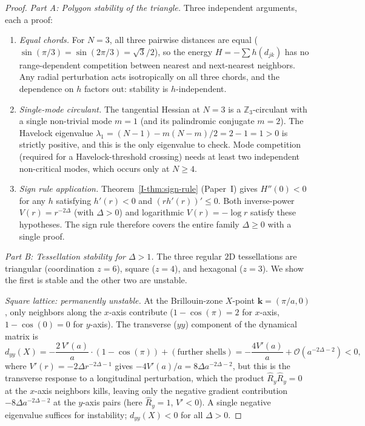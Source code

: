 \begin{proof}
\emph{Part A: Polygon stability of the triangle.}
Three independent arguments, each a proof:
\begin{enumerate}
\item \emph{Equal chords.}
  For $N = 3$, all three pairwise distances are equal
  ($\sin(\pi/3) = \sin(2\pi/3) = \sqrt{3}/2$),
  so the energy $H = -\sum h(d_{jk})$ has no
  range-dependent competition between nearest and next-nearest
  neighbors.
  Any radial perturbation acts isotropically on all three chords,
  and the dependence on $h$ factors out: stability is
  $h$-independent.

\item \emph{Single-mode circulant.}
  The tangential Hessian at $N = 3$ is a $\mathbb{Z}_3$-circulant
  with a single non-trivial mode $m = 1$ (and its palindromic
  conjugate $m = 2$).
  The Havelock eigenvalue
  $\lambda_1 = (N{-}1) - m(N{-}m)/2 = 2 - 1 = 1 > 0$
  is strictly positive, and this is the only eigenvalue
  to check.
  Mode competition (required for a Havelock-threshold crossing)
  needs at least two independent non-critical modes, which occurs
  only at $N \ge 4$.

\item \emph{Sign rule application.}
  Theorem~\ref*{I-thm:sign-rule} (Paper~I) gives $H''(0) < 0$
  for any $h$ satisfying $h'(r) < 0$ and $(rh'(r))' \le 0$.
  Both inverse-power $V(r) = r^{-2\Delta}$ (with $\Delta > 0$) and
  logarithmic $V(r) = -\log r$ satisfy these hypotheses.
  The sign rule therefore covers the entire family $\Delta \ge 0$
  with a single proof.
\end{enumerate}

\emph{Part B: Tessellation stability for $\Delta > 1$.}
The three regular $2$D tessellations are triangular
(coordination $z = 6$), square ($z = 4$), and hexagonal ($z = 3$).
We show the first is stable and the other two are unstable.

\emph{Square lattice: permanently unstable.}
At the Brillouin-zone $X$-point $\mathbf{k} = (\pi/a, 0)$,
only neighbors along the $x$-axis contribute
($1 - \cos(\pi) = 2$ for $x$-axis, $1 - \cos(0) = 0$
for $y$-axis).
The transverse ($yy$) component of the dynamical matrix is
\[
  d_{yy}(X) = -\frac{2\,V'(a)}{a} \cdot (1 - \cos(\pi))
  + (\text{further shells})
  = -\frac{4 V'(a)}{a} + \mathcal{O}(a^{-2\Delta-2}) < 0,
\]
where $V'(r) = -2\Delta r^{-2\Delta-1}$ gives
$-4V'(a)/a = 8\Delta a^{-2\Delta-2}$, but this is the
transverse response to a longitudinal perturbation,
which the product $\hat R_y \hat R_y = 0$ at the
$x$-axis neighbors kills, leaving only the negative
gradient contribution $-8\Delta a^{-2\Delta-2}$ at the
$y$-axis pairs (here $\hat R_y = 1$, $V' < 0$).
A single negative eigenvalue suffices for instability;
$d_{yy}(X) < 0$ for all $\Delta > 0$.


\end{proof}
